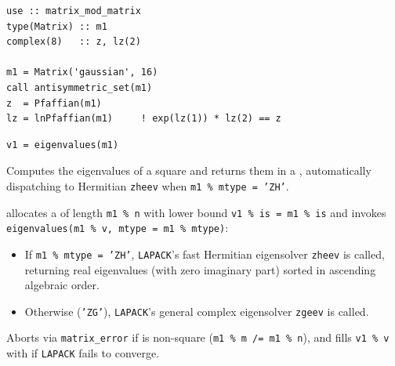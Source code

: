 \begin{description}[leftmargin=2.2cm, style=nextline]
\end{description}

\lstset{language=[95]Fortran}
\begin{lstlisting}
use :: matrix_mod_matrix
type(Matrix) :: m1
complex(8)   :: z, lz(2)

m1 = Matrix('gaussian', 16)
call antisymmetric_set(m1)
z  = Pfaffian(m1)
lz = lnPfaffian(m1)     ! exp(lz(1)) * lz(2) == z
\end{lstlisting}


\lstset{language=[95]Fortran}
\begin{lstlisting}
v1 = eigenvalues(m1)
\end{lstlisting}

Computes the eigenvalues of a square  and returns them in a , automatically dispatching to Hermitian \texttt{zheev} when \texttt{m1 \% mtype = 'ZH'}.

 allocates a   of length \texttt{m1 \% n} with lower bound \texttt{v1 \% is = m1 \% is} and invokes \texttt{eigenvalues(m1 \% v, mtype = m1 \% mtype)}:
\begin{itemize}
  \item If \texttt{m1 \% mtype = 'ZH'}, \texttt{LAPACK}'s fast Hermitian eigensolver \texttt{zheev} is called, returning real eigenvalues (with zero imaginary part) sorted in ascending algebraic order.
  \item Otherwise (\texttt{'ZG'}), \texttt{LAPACK}'s general complex eigensolver \texttt{zgeev} is called.
\end{itemize}
Aborts via \texttt{matrix\_error} if  is non-square (\texttt{m1 \% m /= m1 \% n}), and fills \texttt{v1 \% v} with  if \texttt{LAPACK} fails to converge.

